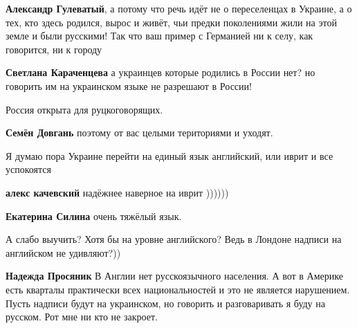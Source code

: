 \begin{itemize}
\begin{itemize}
\textbf{Александр Гулеватый}, а потому что речь идёт не о переселенцах в
Украине, а о тех, кто здесь родился, вырос и живёт, чьи предки
поколениями жили на этой земле и были русскими! Так что ваш
пример с Германией ни к селу, как говорится, ни к городу


\textbf{Светлана Караченцева} а украинцев которые родились в России нет? но
говорить им на украинском языке не разрешают в России!
\end{itemize}


Россия открыта для руцкоговорящих.

\begin{itemize}

\textbf{Семён Довгань} поэтому от вас целыми териториями и уходят.
\end{itemize}


Я думаю пора Украине перейти на единый язык английский, или иврит и все успокоятся🤣

\begin{itemize}

\textbf{алекс качевский} надёжнее наверное на иврит ))))))


\textbf{Екатерина Силина} очень тяжёлый язык.
\end{itemize}


А слабо выучить? Хотя бы на уровне английского? Ведь в Лондоне надписи на английском не удивляют?))

\begin{itemize}

\textbf{Надежда Просяник} В Англии нет русскоязычного населения. А вот в
Америке есть кварталы практически всех национальностей и это не является
нарушением. Пусть надписи будут на украинском, но говорить и разговаривать я
буду на русском. Рот мне ни кто не закроет.


\end{itemize}
\end{itemize}
